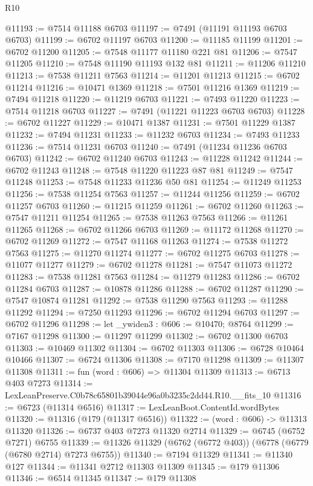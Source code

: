 \begin{lexlean}{R10}
\begin{coremodule}
@11193 := @7514 @11188 @6703
@11197 := @7491 (@11191 @11193 @6703 @6703)
@11199 := @6702 @11197 @6703
@11200 := @11185 @11199
@11201 := @6702 @11200
@11205 := @7548 @11177 @11180 @221 @81
@11206 := @7547 @11205
@11210 := @7548 @11190 @11193 @132 @81
@11211 := @11206 @11210
@11213 := @7538 @11211 @7563
@11214 := @11201 @11213
@11215 := @6702 @11214
@11216 := @10471 @1369
@11218 := @7501 @11216 @1369
@11219 := @7494 @11218
@11220 := @11219 @6703
@11221 := @7493 @11220
@11223 := @7514 @11218 @6703
@11227 := @7491 (@11221 @11223 @6703 @6703)
@11228 := @6702 @11227
@11229 := @10471 @1387
@11231 := @7501 @11229 @1387
@11232 := @7494 @11231
@11233 := @11232 @6703
@11234 := @7493 @11233
@11236 := @7514 @11231 @6703
@11240 := @7491 (@11234 @11236 @6703 @6703)
@11242 := @6702 @11240 @6703
@11243 := @11228 @11242
@11244 := @6702 @11243
@11248 := @7548 @11220 @11223 @87 @81
@11249 := @7547 @11248
@11253 := @7548 @11233 @11236 @50 @81
@11254 := @11249 @11253
@11256 := @7538 @11254 @7563
@11257 := @11244 @11256
@11259 := @6702 @11257 @6703
@11260 := @11215 @11259
@11261 := @6702 @11260
@11263 := @7547 @11211 @11254
@11265 := @7538 @11263 @7563
@11266 := @11261 @11265
@11268 := @6702 @11266 @6703
@11269 := @11172 @11268
@11270 := @6702 @11269
@11272 := @7547 @11168 @11263
@11274 := @7538 @11272 @7563
@11275 := @11270 @11274
@11277 := @6702 @11275 @6703
@11278 := @11077 @11277
@11279 := @6702 @11278
@11281 := @7547 @11073 @11272
@11283 := @7538 @11281 @7563
@11284 := @11279 @11283
@11286 := @6702 @11284 @6703
@11287 := @10878 @11286
@11288 := @6702 @11287
@11290 := @7547 @10874 @11281
@11292 := @7538 @11290 @7563
@11293 := @11288 @11292
@11294 := @7250 @11293
@11296 := @6702 @11294 @6703
@11297 := @6702 @11296
@11298 := let _ywiden3 : @606 := @10470; @8764
@11299 := @7167 @11298
@11300 := @11297 @11299
@11302 := @6702 @11300 @6703
@11303 := @10469 @11302
@11304 := @6702 @11303
@11306 := @6728 @10464 @10466
@11307 := @6724 @11306
@11308 := @7170 @11298
@11309 := @11307 @11308
@11311 := fun (word : @606) => @11304 @11309
@11313 := @6713 @403 @7273
@11314 := LexLeanPreserve.C0b78c65801b39044e96a0b3235c2dd44.R10.__fits_10
@11316 := @6723 (@11314 @6516)
@11317 := LexLeanBoot.ContentId.wordBytes
@11320 := @11316 (@179 (@11317 @6516))
@11322 := (word : @606) -> @11313 @11320
@11326 := @6737 @403 @7273 @11320 @2714
@11329 := @6745 (@6752 @7271) @6755
@11339 := @11326 @11329 (@6762 (@6772 @403)) (@6778 (@6779 (@6780 @2714) @7273 @6755))
@11340 := @7194 @11329
@11341 := @11340 @127
@11344 := @11341 @2712 @11303 @11309
@11345 := @179 @11306
@11346 := @6514 @11345
@11347 := @179 @11308

\end{coremodule}
\end{lexlean}
